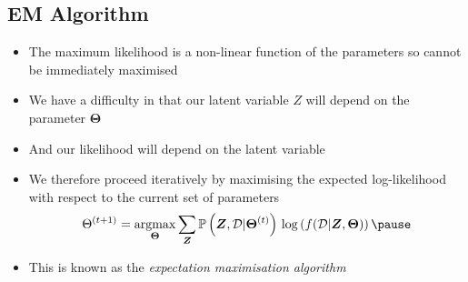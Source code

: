
\begin{slide}
\section[-1]{EM Algorithm}

\begin{PauseHighLight}
  \begin{itemize}
  \item The maximum likelihood is a non-linear function of the
    parameters so cannot be immediately maximised\pause
  \item We have a difficulty in that our latent variable $Z$ will depend
    on the parameter $\bm{\Theta}$\pause
  \item And our likelihood will depend on the latent variable\pause
  \item We therefore proceed iteratively by maximising the expected
    log-likelihood with respect to the current set of parameters
    \begin{align*}
      \Theta^{(t+1)} = \mathop{\mathrm{argmax}}_{\bm{\Theta}}
      \sum_{\bm{Z}} \Prob{\bm{Z},\data|\bm{\Theta}^{(t)}}\,
      \logg{f(\data|\bm{Z}, \bm{\Theta})}\pause
    \end{align*}
  \item This is known as the \emph{expectation maximisation algorithm}\pause
  \end{itemize}
\end{PauseHighLight}

\end{slide}


